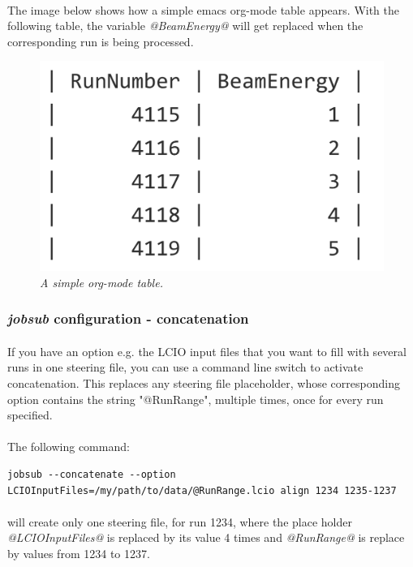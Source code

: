 \documentclass[11pt]{article}
\begin{document}
\paragraph{}
The image below shows how a simple emacs org-mode table appears. With the following table, the variable \textit{@BeamEnergy@} will get replaced when the corresponding run is being processed.
\begin{figure}[!ht]
	\centering
	\includegraphics[scale=0.25]{images/orgtable.png}
	\caption{\textit{A simple org-mode table.}}
\end{figure}
\subsubsection{\textit{jobsub} configuration - concatenation}
\paragraph{}
If you have an option e.g. the LCIO input files that you want to fill with several runs in one steering file, you can use a command line switch to activate concatenation. This replaces any steering file placeholder, whose corresponding option contains the string "@RunRange", multiple times, once for every run specified.
\paragraph{}
The following command:
\begin{verbatim}
jobsub --concatenate --option LCIOInputFiles=/my/path/to/data/@RunRange.lcio align 1234 1235-1237
\end{verbatim}
\paragraph{}
will create only one steering file, for run 1234, where the place holder \textit{@LCIOInputFiles@} is replaced by its value 4 times and \textit{@RunRange@} is replace by values from 1234 to 1237.
\end{document}

